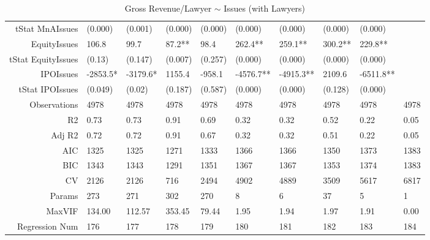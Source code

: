 \begin{table}[ht]
\begin{tabular}{rlllllllll}
  tStat MnAIssues & (0.000) & (0.001) & (0.000) & (0.000) & (0.000) & (0.000) & (0.000) & (0.000) &  \\ 
  EquityIssues & 106.8 & 99.7 & 87.2** & 98.4 & 262.4** & 259.1** & 300.2** & 229.8** &  \\ 
  tStat EquityIssues & (0.13) & (0.147) & (0.007) & (0.257) & (0.000) & (0.000) & (0.000) & (0.000) &  \\ 
  IPOIssues & -2853.5* & -3179.6* & 1155.4 & -958.1 & -4576.7** & -4915.3** & 2109.6 & -6511.8** &  \\ 
  tStat IPOIssues & (0.049) & (0.02) & (0.187) & (0.587) & (0.000) & (0.000) & (0.128) & (0.000) &  \\ 
  Observations & 4978 & 4978 & 4978 & 4978 & 4978 & 4978 & 4978 & 4978 & 4978 \\ 
  R2 & 0.73 & 0.73 & 0.91 & 0.69 & 0.32 & 0.32 & 0.52 & 0.22 & 0.05 \\ 
  Adj R2 & 0.72 & 0.72 & 0.91 & 0.67 & 0.32 & 0.32 & 0.51 & 0.22 & 0.05 \\ 
  AIC & 1325 & 1325 & 1271 & 1333 & 1366 & 1366 & 1350 & 1373 & 1383 \\ 
  BIC & 1343 & 1343 & 1291 & 1351 & 1367 & 1367 & 1353 & 1374 & 1383 \\ 
  CV & 2126 & 2126 & 716 & 2494 & 4902 & 4889 & 3509 & 5617 & 6817 \\ 
  Params & 273 & 271 & 302 & 270 & 8 & 6 & 37 & 5 & 1 \\ 
  MaxVIF & 134.00 & 112.57 & 353.45 & 79.44 & 1.95 & 1.94 & 1.97 & 1.91 & 0.00 \\ 
  Regression Num & 176 & 177 & 178 & 179 & 180 & 181 & 182 & 183 & 184 \\ 
   \hline
\end{tabular}
\caption{Gross Revenue/Lawyer $\sim$ Issues (with Lawyers)} 
\end{table}
